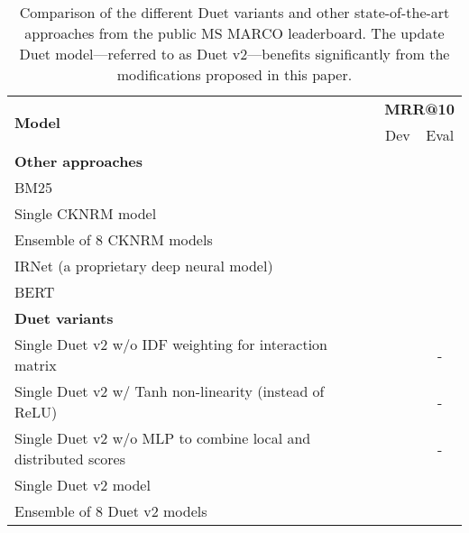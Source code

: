 \documentclass{article}
\begin{document}
\begin{table}[t]
    \centering
    \caption{Comparison of the different Duet variants and other state-of-the-art approaches from the public MS MARCO leaderboard. The update Duet model---referred to as Duet v2---benefits significantly from the modifications proposed in this paper.}
    \begin{tabular}{lcc}
    \hline
    \hline
        \multirow{2}{*}{\textbf{Model}} & \multicolumn{2}{c}{\textbf{MRR@10}} \\
        & Dev & Eval \\
        \hline
        \multicolumn{3}{l}{\textbf{Other approaches}} \\
        BM25 &  &  \\
        Single CKNRM \citep{dai2018convolutional} model &  &  \\
        Ensemble of 8 CKNRM \citep{dai2018convolutional} models &  &  \\
        IRNet (a proprietary deep neural model) &  &  \\
        BERT \citep{nogueira2019passage} &  &  \\
        \hline
        \multicolumn{3}{l}{\textbf{Duet variants}} \\
        Single Duet v2 w/o IDF weighting for interaction matrix &  & - \\
        Single Duet v2 w/ Tanh non-linearity (instead of ReLU) &  & - \\
        Single Duet v2 w/o MLP to combine local and distributed scores &  & - \\
        Single Duet v2 model &  &  \\
        Ensemble of 8 Duet v2 models &  &  \\
        \hline
        \hline
    \end{tabular}
    \label{tbl:results}
\end{table}
\end{document}
